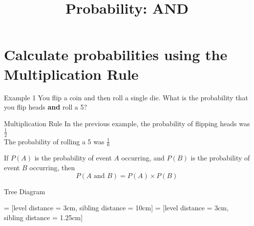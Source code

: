\documentclass[t]{beamer}
\title{Probability: AND}
\author{}
\date{}
\begin{document}
\begin{frame} 
\maketitle
\end{frame}

\section{Calculate probabilities using the Multiplication Rule}

\begin{frame}{Example 1}
You flip a coin and then roll a single die. What is the probability that you flip heads {\color{blue}\textbf{and}} roll a 5?	\newline\\	
\end{frame}

\begin{frame}{Multiplication Rule}
In the previous example, the probability of flipping heads was $\frac{1}{2}$	\newline\\	\pause
The probability of rolling a 5 was $\frac{1}{6}$	\newline\\	\pause
\begin{tcolorbox}[colframe=green!20!black, colback = green!30!white,title=\textbf{Multiplication Rule}]
If $P(A)$ is the probability of event $A$ occurring, and $P(B)$ is the probability of event $B$ occurring, then
\[P(A\text{ and } B) = P(A) \times P(B)\]
\end{tcolorbox}
\end{frame}

\begin{frame}{Tree Diagram}
\begin{center}
 = [level distance = 3cm, sibling distance = 10cm]
 = [level distance = 3cm, sibling distance = 1.25cm]
\end{center}
\end{frame}
\end{document}
